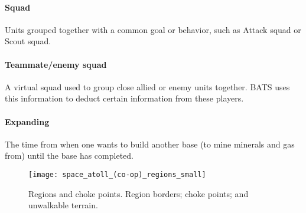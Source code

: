 \paragraph{Squad} Units grouped together with a common goal or behavior, such as Attack squad or Scout squad.
\paragraph{Teammate/enemy squad} A virtual squad used to group close allied or enemy units together.
BATS uses this information to deduct certain information from these players.
\paragraph{Expanding} The time from when one wants to build another base (to mine minerals and gas
from) until the base has completed.

\begin{figure}[htb]
	\centering
	\texttt{[image: space\_atoll\_(co-op)\_regions\_small]}
	\caption[Regions and choke points]{
		Regions and choke points.
		\usebox{\LegendLineLightGreen} Region borders;
		\usebox{\LegendLineRed} choke points; and
		\usebox{\LegendBoxYellow} unwalkable terrain.}
	\label{fig:region_and_choke_points}
\end{figure}
